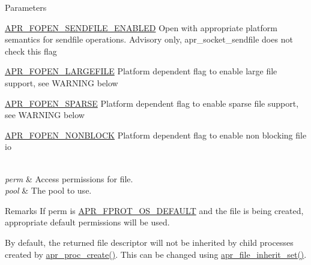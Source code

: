 \begin{DoxyParams}{Parameters}
\begin{DoxyItemize}
\hyperlink{group__apr__file__open__flags_ga60c21e28e4a612d58a874fe2cc71a6e4}{A\+P\+R\+\_\+\+F\+O\+P\+E\+N\+\_\+\+S\+E\+N\+D\+F\+I\+L\+E\+\_\+\+E\+N\+A\+B\+L\+ED} Open with appropriate platform semantics for sendfile operations. Advisory only, apr\+\_\+socket\+\_\+sendfile does not check this flag \item \hyperlink{group__apr__file__open__flags_gaf6cfaa4789e6264afd186235f0adbc22}{A\+P\+R\+\_\+\+F\+O\+P\+E\+N\+\_\+\+L\+A\+R\+G\+E\+F\+I\+LE} Platform dependent flag to enable large file support, see W\+A\+R\+N\+I\+NG below \item \hyperlink{group__apr__file__open__flags_ga0d155e9bb7fbf1a5cd4e84b5ede059f4}{A\+P\+R\+\_\+\+F\+O\+P\+E\+N\+\_\+\+S\+P\+A\+R\+SE} Platform dependent flag to enable sparse file support, see W\+A\+R\+N\+I\+NG below \item \hyperlink{group__apr__file__open__flags_ga31e4d14068147e43e1778bcf975dda62}{A\+P\+R\+\_\+\+F\+O\+P\+E\+N\+\_\+\+N\+O\+N\+B\+L\+O\+CK} Platform dependent flag to enable non blocking file io \end{DoxyItemize}
\\
\hline
{\em perm} & Access permissions for file. \\
\hline
{\em pool} & The pool to use. \\
\hline
\end{DoxyParams}
\begin{DoxyRemark}{Remarks}
If perm is \hyperlink{group__apr__file__permissions_gad3c65a67ee6eb12ecc6a33857397900b}{A\+P\+R\+\_\+\+F\+P\+R\+O\+T\+\_\+\+O\+S\+\_\+\+D\+E\+F\+A\+U\+LT} and the file is being created, appropriate default permissions will be used. 

By default, the returned file descriptor will not be inherited by child processes created by \hyperlink{group__apr__thread__proc_gab51dd90b98d365a969f0ec5c7bef4e14}{apr\+\_\+proc\+\_\+create()}. This can be changed using \hyperlink{group__apr__file__io_ga137bee13d2c65fb8afd4b34e400187c7}{apr\+\_\+file\+\_\+inherit\+\_\+set()}. 
\end{DoxyRemark}
